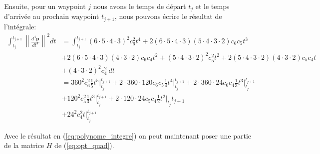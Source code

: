 \documentclass{article}
\newcommand{\norm}[1]{\left\lVert#1\right\rVert}
\begin{document}
Ensuite, pour un waypoint $j$ nous avons le temps de départ $t_j$ et le temps d'arrivée au prochain waypoint $t_{j+1}$, nous pouvons écrire le résultat de l'intégrale:
\begin{align}\label{eq:polynome_integre}
\int_{t_j}^{t_{j+1}} \norm{\frac{d^4 \boldsymbol{p}}{dt^4}}^2 dt
	& = \int_{t_j}^{t_{j+1}} (6\cdot 5\cdot 4\cdot 3)^2 c_6^2 t^4 + 2(6\cdot 5\cdot 4\cdot 3)(5 \cdot 4\cdot 3\cdot 2) c_6 c_5 t^3 \\
	&	+ 2(6 \cdot 5 \cdot 4\cdot 3)(4\cdot 3\cdot 2)c_6 c_4 t^2 + (5 \cdot 4\cdot 3\cdot 2)^2 c_5^2 t^2 + 2(5 \cdot 4\cdot 3\cdot 2)(4\cdot 3\cdot 2)c_5 c_4 t \nonumber \\
	&	+ (4\cdot 3\cdot 2)^2 c_4^2 \ dt\nonumber \\
	&=	360^2 c_6^2 \frac{1}{5} t^5 \Big|_{t_j}^{t_{j+1}}
		+ 2 \cdot 360 \cdot 120 c_6 c_5 \frac{1}{4} t^4\Big|_{t_j}^{t_{j+1}}
		+ 2 \cdot 360 \cdot 24 c_6 c_4 \frac{1}{3} t^3\Big|_{t_j}^{t_{j+1}} \nonumber \\
	&	+ 120^2 c_5^2 \frac{1}{3} t^3\Big|_{t_j}^{t_{j+1}} + 2 \cdot 120 \cdot 24 c_5 c_4 \frac{1}{2}t^2 \Big|_{t_j}{t_{j+1}} \nonumber \\
	&	+ 24^2 c_4^2 t\Big|_{t_j}^{t_{j+1}} \nonumber
\end{align}


Avec le résultat en (\ref{eq:polynome_integre}) on peut maintenant poser une partie de la matrice $H$ de (\ref{eq:opt_quad}).
\end{document}
